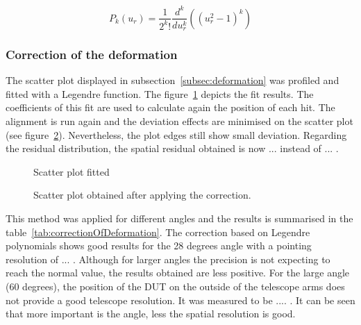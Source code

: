       \begin{equation}
        P_{k}\left(u_{r}\right) = \frac{1}{2^{k}!}\frac{d^{k}}{du_{r}^{k}} \left( (u_{r}^2 - 1)^{k}\right)
        \label{eq:Legendre}
      \end{equation}

      \begin{figure}
      \end{figure}

      \subsubsection{Correction of the deformation}

      The scatter plot displayed in subsection~\ref{subsec:deformation} was profiled and fitted with a Legendre function.
      The figure~\ref{fig:scatterFitted} depicts the fit results. 
      The coefficients of this fit are used to calculate again the position of each hit.
      The alignment is run again and the deviation effects are minimised on the scatter plot (see figure~\ref{fig:scatterCorrected}).
      Nevertheless, the plot edges still show small deviation.
      Regarding the residual distribution, the spatial residual obtained is now ... instead of ... .

      \begin{figure}
        \caption{Scatter plot fitted}
        \label{fig:scatterFitted}
      \end{figure}

      \begin{figure}
        \caption{Scatter plot obtained after applying the correction.}
        \label{fig:scatterCorrected}
      \end{figure}

      This method was applied for different angles and the results is summarised in the table~\ref{tab:correctionOfDeformation}. 
      The correction based on Legendre polynomials shows good results for the 28 degrees angle with a pointing resolution of ... .
      Although for larger angles the precision is not expecting to reach the normal value, the results obtained are less positive.
      For the large angle (60 degrees), the position of the \gls{DUT} on the outside of the telescope arms does not provide a good telescope resolution.
      It was measured to be .... .
      It can be seen that more important is the angle, less the spatial resolution is good. 

